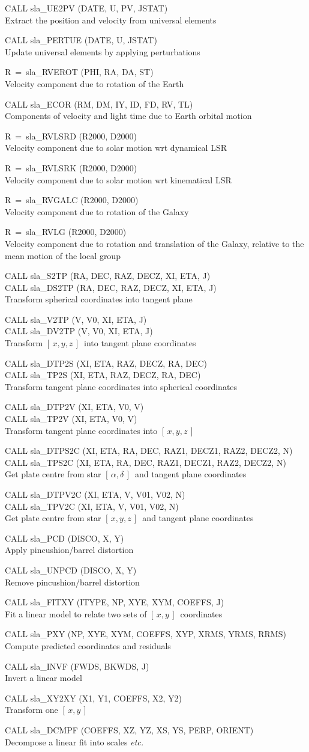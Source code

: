 \documentclass[11pt,twoside]{article}
\newcommand{\radec}     {$[\,\alpha,\delta\,]$}
\newcommand{\xy}        {$[\,x,y\,]$}
\newcommand{\xyz}       {$[\,x,y,z\,]$}
\newcommand{\callhead}[1]{\goodbreak\vspace{\bigskipamount}{\large\bf{#1}}}
\newenvironment{callset}{\begin{list}{}{\setlength{\leftmargin}{2cm}
                             \setlength{\parsep}{\smallskipamount}}}{\end{list}}
\newcommand{\subp}[1]{\item\hspace{-1cm}#1\\}
\newcommand{\subq}[2]{\item\hspace{-1cm}#1\\\hspace*{-1cm}#2\\}
\begin{document}
\begin{callset}
\subp{CALL sla\_UE2PV (DATE, U, PV, JSTAT)}
   Extract the position and velocity from universal elements
\subp{CALL sla\_PERTUE (DATE, U, JSTAT)}
   Update universal elements by applying perturbations
\subp{R~=~sla\_RVEROT (PHI, RA, DA, ST)}
   Velocity component due to rotation of the Earth
\subp{CALL sla\_ECOR (RM, DM, IY, ID, FD, RV, TL)}
   Components of velocity and light time due to Earth orbital motion
\subp{R~=~sla\_RVLSRD (R2000, D2000)}
   Velocity component due to solar motion wrt dynamical LSR
\subp{R~=~sla\_RVLSRK (R2000, D2000)}
   Velocity component due to solar motion wrt kinematical LSR
\subp{R~=~sla\_RVGALC (R2000, D2000)}
   Velocity component due to rotation of the Galaxy
\subp{R~=~sla\_RVLG (R2000, D2000)}
   Velocity component due to rotation and translation of the
   Galaxy, relative to the mean motion of the local group
\end{callset}

\callhead{Astrometry}
\begin{callset}
\subq{CALL sla\_S2TP (RA, DEC, RAZ, DECZ, XI, ETA, J)}
     {CALL sla\_DS2TP (RA, DEC, RAZ, DECZ, XI, ETA, J)}
   Transform spherical coordinates into tangent plane
\subq{CALL sla\_V2TP (V, V0, XI, ETA, J)}
     {CALL sla\_DV2TP (V, V0, XI, ETA, J)}
   Transform \xyz\ into tangent plane coordinates
\subq{CALL sla\_DTP2S (XI, ETA, RAZ, DECZ, RA, DEC)}
     {CALL sla\_TP2S (XI, ETA, RAZ, DECZ, RA, DEC)}
   Transform tangent plane coordinates into spherical coordinates
\subq{CALL sla\_DTP2V (XI, ETA, V0, V)}
     {CALL sla\_TP2V (XI, ETA, V0, V)}
   Transform tangent plane coordinates into \xyz
\subq{CALL sla\_DTPS2C (XI, ETA, RA, DEC, RAZ1, DECZ1, RAZ2, DECZ2, N)}
     {CALL sla\_TPS2C (XI, ETA, RA, DEC, RAZ1, DECZ1, RAZ2, DECZ2, N)}
   Get plate centre from star \radec\ and tangent plane coordinates
\subq{CALL sla\_DTPV2C (XI, ETA, V, V01, V02, N)}
     {CALL sla\_TPV2C (XI, ETA, V, V01, V02, N)}
   Get plate centre from star \xyz\ and tangent plane coordinates
\subp{CALL sla\_PCD (DISCO, X, Y)}
   Apply pincushion/barrel distortion
\subp{CALL sla\_UNPCD (DISCO, X, Y)}
   Remove pincushion/barrel distortion
\subp{CALL sla\_FITXY (ITYPE, NP, XYE, XYM, COEFFS, J)}
   Fit a linear model to relate two sets of \xy\ coordinates
\subp{CALL sla\_PXY (NP, XYE, XYM, COEFFS, XYP, XRMS, YRMS, RRMS)}
   Compute predicted coordinates and residuals
\subp{CALL sla\_INVF (FWDS, BKWDS, J)}
   Invert a linear model
\subp{CALL sla\_XY2XY (X1, Y1, COEFFS, X2, Y2)}
   Transform one \xy
\subp{CALL sla\_DCMPF (COEFFS, XZ, YZ, XS, YS, PERP, ORIENT)}
   Decompose a linear fit into scales {\it etc.}
\end{callset}
\end{document}
